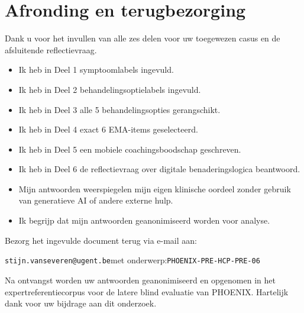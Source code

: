 \documentclass[11pt,a4paper]{article}
\begin{document}
\section{Afronding en terugbezorging}

Dank u voor het invullen van alle zes delen voor uw toegewezen casus
en de afsluitende reflectievraag.

\begin{instrbox}[title=Checklist voor terugbezorging]
\begin{itemize}
\item[$\square$] Ik heb in Deel 1 symptoomlabels ingevuld.
\item[$\square$] Ik heb in Deel 2 behandelingsoptielabels ingevuld.
\item[$\square$] Ik heb in Deel 3 alle 5 behandelingsopties gerangschikt.
\item[$\square$] Ik heb in Deel 4 exact 6 EMA-items geselecteerd.
\item[$\square$] Ik heb in Deel 5 een mobiele coachingsboodschap geschreven.
\item[$\square$] Ik heb in Deel 6 de reflectievraag over digitale benaderingslogica beantwoord.
\item[$\square$] Mijn antwoorden weerspiegelen mijn eigen klinische oordeel zonder gebruik van generatieve AI of andere externe hulp.
\item[$\square$] Ik begrijp dat mijn antwoorden geanonimiseerd worden voor analyse.
\end{itemize}
\end{instrbox}

\medskip
Bezorg het ingevulde document terug via e-mail aan:
\begin{center}
\texttt{stijn.vanseveren@ugent.be}\quad met onderwerp:\quad \texttt{PHOENIX-PRE-HCP-PRE-06}
\end{center}

\vspace{0.5em}
\begin{tcolorbox}[colback=AccentBlue,colframe=PrimaryBlue,arc=2mm,boxrule=0.6pt,left=8pt,right=8pt,top=7pt,bottom=7pt]
\small\centering
Na ontvangst worden uw antwoorden geanonimiseerd en opgenomen in het expertreferentiecorpus
voor de latere blind evaluatie van PHOENIX. Hartelijk dank voor uw bijdrage aan dit onderzoek.
\end{tcolorbox}
\end{document}
